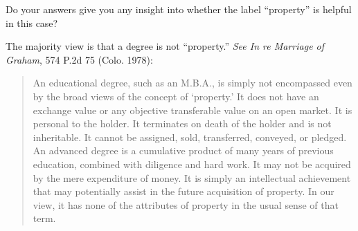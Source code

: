 Do your answers give you any insight into whether the label ``property'' is
helpful in this case?

\item
The majority view is that a degree is not ``property.'' \textit{See In re
Marriage of Graham}, 574 P.2d 75 (Colo. 1978):
\begin{quote}
An educational degree, such as an M.B.A., is simply not encompassed even by the
broad views of the concept of `property.' It does not have an exchange value or
any objective transferable value on an open market. It is personal to the
holder. It terminates on death of the holder and is not inheritable. It cannot
be assigned, sold, transferred, conveyed, or pledged. An advanced degree is a
cumulative product of many years of previous education, combined with diligence
and hard work. It may not be acquired by the mere expenditure of money. It is
simply an intellectual achievement that may potentially assist in the future
acquisition of property. In our view, it has none of the attributes of property
in the usual sense of that term.
\end{quote}

